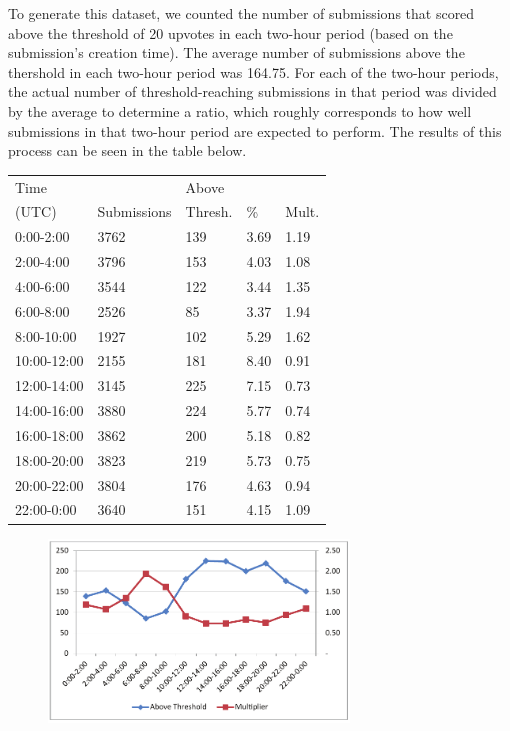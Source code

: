 \documentclass{acm_proc_article-sp}
\begin{document}
To generate this dataset, we counted the number of submissions that scored above the threshold of 20 upvotes in each two-hour period
(based on the submission's creation time).  The average number of submissions above the thershold in each two-hour period was 164.75.
For each of the two-hour periods, the actual number of threshold-reaching submissions in that period was divided by the average to
determine a ratio, which roughly corresponds to how well submissions in that two-hour period are expected to perform.  The results
of this process can be seen in the table below.

\begin{table}[h!]
    \begin{tabular}{l|llll}
    Time  &             & Above   &      &       \\
    (UTC) & Submissions & Thresh. & \%   & Mult. \\ \hline
    0:00-2:00        & 3762        & 139             & 3.69 & 1.19       \\
    2:00-4:00        & 3796        & 153             & 4.03 & 1.08       \\
    4:00-6:00        & 3544        & 122             & 3.44 & 1.35       \\
    6:00-8:00        & 2526        & 85              & 3.37 & 1.94       \\
    8:00-10:00       & 1927        & 102             & 5.29 & 1.62       \\
    10:00-12:00      & 2155        & 181             & 8.40 & 0.91       \\
    12:00-14:00      & 3145        & 225             & 7.15 & 0.73       \\
    14:00-16:00      & 3880        & 224             & 5.77 & 0.74       \\
    16:00-18:00      & 3862        & 200             & 5.18 & 0.82       \\
    18:00-20:00      & 3823        & 219             & 5.73 & 0.75       \\
    20:00-22:00      & 3804        & 176             & 4.63 & 0.94       \\
    22:00-0:00       & 3640        & 151             & 4.15 & 1.09       \\
    \end{tabular}
\end{table}

\begin{figure}[h!]
\includegraphics[width=8cm]{timeweightinggraph.pdf}
\end{figure}
\end{document}
